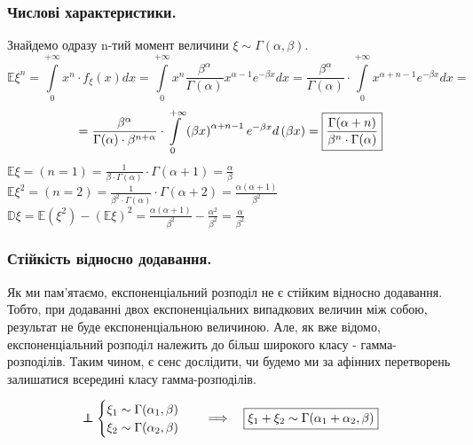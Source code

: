 \subsubsection{Числові характеристики.}
Знайдемо одразу n-тий момент величини $ \xi \sim \Gamma(\alpha, \beta)$.
$$
\mathbb{E} \xi^n =  \int\limits_{0}^{ +\infty}{ x^n \cdot f_{\xi} (x) dx} =  \int\limits_{0}^{ +\infty}{x^n  \frac{\beta^{\alpha}}{\Gamma(\alpha)} x^{\alpha-1}e^{-\beta x}}dx = \frac{\beta^{\alpha}}{\Gamma(\alpha)} \cdot   \int\limits_{0}^{ +\infty}{ x^{\alpha+n-1}e^{-\beta x}}dx =
$$
$$
=  \frac{\beta^{\alpha}}{\Gamma(\alpha) \cdot \beta^{n + \alpha}} \cdot   \int\limits_{0}^{ +\infty}{ \left( \beta x \right) ^{\alpha+n-1}e^{-\beta x}} d \left( \beta x \right)  = \fbox{$ \dfrac{\Gamma(\alpha + n)}{ \beta^n \cdot \Gamma(\alpha)}$}
$$
$
\mathbb{E} \xi = (n = 1 ) = \frac{1}{ \beta \cdot \Gamma (\alpha)} \cdot \Gamma(\alpha+1) = \frac{\alpha}{\beta}
$\\
$
\mathbb{E} \xi^2 = (n = 2) = \frac{1}{\beta^2 \cdot \Gamma (\alpha) }  \cdot \Gamma(\alpha + 2) = \frac{\alpha ( \alpha + 1)}{\beta^2}
$\\
$
\mathbb{D} \xi = \mathbb{E}(\xi^2) - \left( \mathbb{E}\xi \right) ^2 = \frac{\alpha ( \alpha + 1)}{\beta^2} - \frac{\alpha^2}{\beta^2} = \frac{\alpha}{\beta^2}
$
\subsubsection{Стійкість відносно додавання.}

Як ми пам'ятаємо, експоненціальний розподіл не є стійким відносно додавання. Тобто, при додаванні двох експоненціальних випадкових величин між собою, результат не буде експоненціальною величиною. Але, як вже відомо, експоненціальний розподіл належить до більш широкого класу - гамма-розподілів. Таким чином, є сенс дослідити, чи будемо ми за афінних перетворень залишатися всередині класу гамма-розподілів.
\begin{boxteo}
$$
 \independent \begin{cases}
  \xi_1 \sim \Gamma (\alpha_1, \beta)\\
  \xi_2 \sim \Gamma (\alpha_2, \beta)
\end{cases} \quad \Longrightarrow \quad \fbox{$ \xi_1 + \xi_2 \sim \Gamma(\alpha_1 + \alpha_2 , \beta)$}
$$
\end{boxteo}

